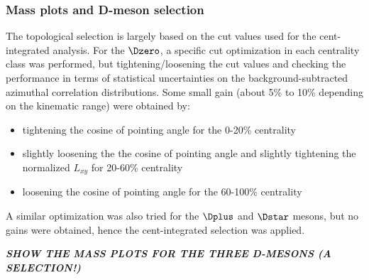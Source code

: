 \subsubsection{Mass plots and D-meson selection}
The topological selection is largely based on the cut values used for the cent-integrated analysis.
For the $\Dzero$, a specific cut optimization in each centrality class was performed, but tightening/loosening the cut values and checking the performance in terms of statistical uncertainties on the background-subtracted azimuthal correlation distributions.
Some small gain (about 5\% to 10\% depending on the kinematic range) were obtained by:
\begin{itemize}
  \item tightening the cosine of pointing angle for the 0-20\% centrality
  \item slightly loosening the the cosine of pointing angle and slightly tightening the normalized $L_{xy}$  for 20-60\% centrality
  \item loosening the cosine of pointing angle for the 60-100\% centrality
\end{itemize}
A similar optimization was also tried for the $\Dplus$ and $\Dstar$ mesons, but no gains were obtained, hence the cent-integrated selection was applied.

\textit{\textbf{SHOW THE MASS PLOTS FOR THE THREE D-MESONS (A SELECTION!)}}

